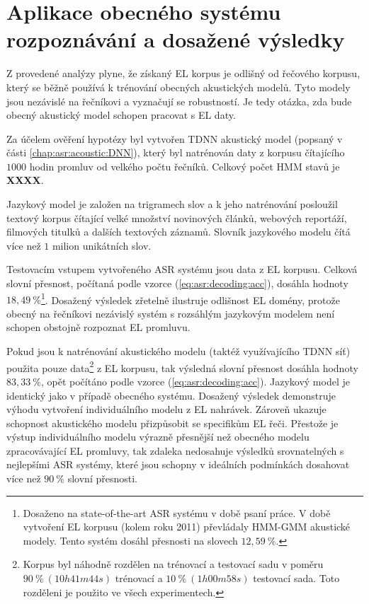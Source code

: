 \section{Aplikace obecného systému rozpoznávání a dosažené výsledky}
\label{chap:construction:results}

Z provedené analýzy plyne, že získaný EL korpus je odlišný od  řečového korpusu, který se běžně používá k trénování obecných akustických modelů.
Tyto modely jsou nezávislé na řečníkovi a vyznačují se robustností.
Je tedy otázka, zda bude obecný akustický model schopen pracovat s EL daty.

Za účelem ověření hypotézy byl vytvořen TDNN akustický model (popsaný v části \ref{chap:asr:acoustic:DNN}), který byl natrénován daty z korpusu čítajícího $1000$ hodin promluv od velkého počtu řečníků.
Celkový počet HMM stavů je \textbf{XXXX}.

Jazykový model je založen na trigramech slov a k jeho natrénování posloužil textový korpus čítající velké množství novinových článků, webových reportáží, filmových titulků a dalších textových záznamů.
Slovník jazykového modelu čítá více než $1$ milion unikátních slov.

Testovacím vstupem vytvořeného ASR systému jsou data z EL korpusu.
Celková slovní přesnost, počítaná podle vzorce (\ref{eq:asr:decoding:acc}), dosáhla hodnoty $18,49\ \%$\footnote{Dosaženo na state-of-the-art ASR systému v době psaní práce. V době vytvoření EL korpusu (kolem roku 2011) převládaly HMM-GMM akustické modely. Tento systém dosáhl přesnosti na slovech $12,59\ \%$.}.
Dosažený výsledek zřetelně ilustruje odlišnost EL domény, protože obecný na řečníkovi nezávislý systém s rozsáhlým jazykovým modelem není schopen obstojně rozpoznat EL promluvu.

Pokud jsou k natrénování akustického modelu (taktéž využívajícího TDNN síť) použita pouze data\footnote{Korpus byl náhodně rozdělen na trénovací a testovací sadu v poměru $90\ \%\ (10h41m44s)$ trénovací a $10\ \%\ (1h00m58s)$ testovací sada. Toto rozděleni je použito ve všech experimentech.} z EL korpusu, tak výsledná slovní přesnost dosáhla hodnoty $83,33\ \%$, opět počítáno podle vzorce (\ref{eq:asr:decoding:acc}).
Jazykový model je identický jako v případě obecného systému.
Dosažený výsledek demonstruje výhodu vytvoření individuálního modelu z EL nahrávek.
Zároveň ukazuje schopnost akustického modelu přizpůsobit se specifikům EL řeči.
Přestože je výstup individuálního modelu výrazně přesnější než obecného modelu zpracovávající EL promluvy, tak zdaleka nedosahuje výsledků srovnatelných s nejlepšími ASR systémy, které jsou schopny v ideálních podmínkách dosahovat více než $90\ \%$ slovní přesnosti.


